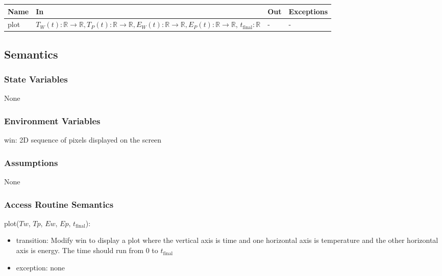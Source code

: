 \documentclass[12pt, titlepage]{article}
\begin{document}
\begin{center}
\begin{tabular}{p{2cm} p{8cm} p{2cm} p{2cm}}
\hline
\textbf{Name} & \textbf{In} & \textbf{Out} & \textbf{Exceptions} \\
\hline
plot & $T_W(t):\mathbb{R} \rightarrow \mathbb{R},
                 T_P(t):\mathbb{R} \rightarrow \mathbb{R},
                 E_W(t):\mathbb{R} \rightarrow \mathbb{R},
       E_P(t):\mathbb{R} \rightarrow \mathbb{R}$, $t_\text{final}: \mathbb{R}$ & - & - \\
\hline
\end{tabular}
\end{center}

\subsection{Semantics}

\subsubsection{State Variables}

None

\subsubsection{Environment Variables}

win: 2D sequence of pixels displayed on the screen\\

\subsubsection{Assumptions}

None

\subsubsection{Access Routine Semantics}

\noindent plot($Tw$, $Tp$, $Ew$, $Ep$, $t_\text{final}$):
\begin{itemize}
\item transition: Modify win to display a plot where the vertical axis
  is time and one horizontal axis is temperature and the other
  horizontal axis is energy.  The time should run from $0$ to $t_\text{final}$
\item exception: none
\end{itemize}
\end{document}
